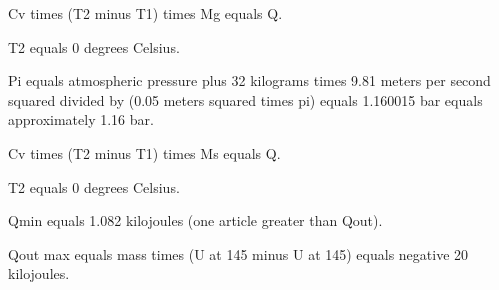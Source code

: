 Cv times (T2 minus T1) times Mg equals Q.  

T2 equals 0 degrees Celsius.  

Pi equals atmospheric pressure plus 32 kilograms times 9.81 meters per second squared divided by (0.05 meters squared times pi) equals 1.160015 bar equals approximately 1.16 bar.  

Cv times (T2 minus T1) times Ms equals Q.  

T2 equals 0 degrees Celsius.  

Qmin equals 1.082 kilojoules (one article greater than Qout).  

Qout max equals mass times (U at 145 minus U at 145) equals negative 20 kilojoules.
